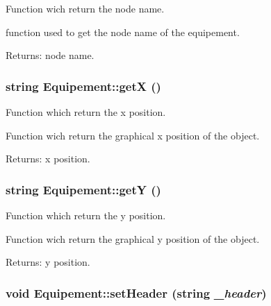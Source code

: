 Function wich return the node name. 

function used to get the node name of the equipement.

\begin{Desc}
\item[Returns:]node name. \end{Desc}
\hypertarget{class_equipement_0899c6ce57408519616fc3c237ca0c83}{
\subsubsection[{getX}]{\setlength{\rightskip}{0pt plus 5cm}string Equipement::getX ()}}
\label{class_equipement_0899c6ce57408519616fc3c237ca0c83}


Function which return the x position. 

Function wich return the graphical x position of the object.

\begin{Desc}
\item[Returns:]x position. \end{Desc}
\hypertarget{class_equipement_daa17552b40be78e18b1cb03087a2a27}{
\subsubsection[{getY}]{\setlength{\rightskip}{0pt plus 5cm}string Equipement::getY ()}}
\label{class_equipement_daa17552b40be78e18b1cb03087a2a27}


Function which return the y position. 

Function wich return the graphical y position of the object.

\begin{Desc}
\item[Returns:]y position. \end{Desc}
\hypertarget{class_equipement_95b372e1d9f733f4c8fde9b3a1cf8321}{
\subsubsection[{setHeader}]{\setlength{\rightskip}{0pt plus 5cm}void Equipement::setHeader (string {\em \_\-header})}}
\label{class_equipement_95b372e1d9f733f4c8fde9b3a1cf8321}


